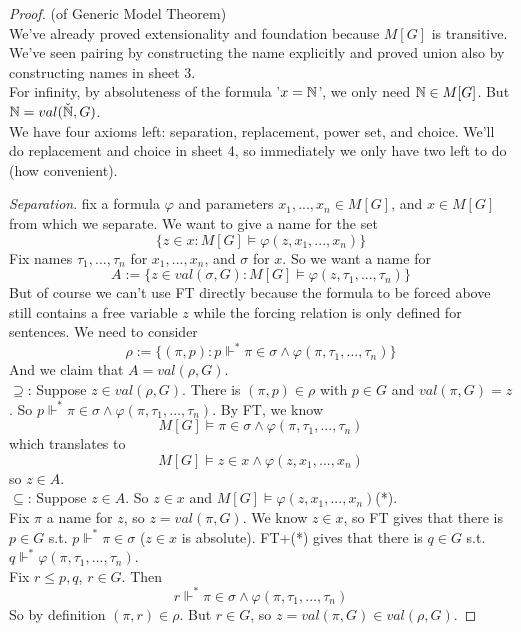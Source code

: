 \documentclass[a4paper]{article}
\begin{document}
\begin{proof} (of Generic Model Theorem)\\
We've already proved extensionality and foundation because $M[G]$ is transitive. We've seen pairing by constructing the name explicitly and proved union also by constructing names in sheet 3.\\
For infinity, by absoluteness of the formula '$x=\mathbb{N}$', we only need $\mathbb{N} \in M[G]$. But $\mathbb{N} = val(\check{\mathbb{N}},G)$.\\
We have four axioms left: separation, replacement, power set, and choice. We'll do replacement and choice in sheet 4, so immediately we only have two left to do (how convenient).

\emph{Separation}. fix a formula $\varphi$ and parameters $x_1,...,x_n \in M[G]$, and $x \in M[G]$ from which we separate. We want to give a name for the set 
\[
\{z \in x: M[G] \vDash \varphi(z,x_1,...,x_n)\}
\]
Fix names $\tau_1,...,\tau_n$ for $x_1,...,x_n$, and $\sigma$ for $x$. So we want a name for
\[
A:=\{z \in val(\sigma,G): M[G] \vDash \varphi(z,\tau_1,...,\tau_n)\}
\]
But of course we can't use FT directly because the formula to be forced above still contains a free variable $z$ while the forcing relation is only defined for sentences. We need to consider
\[
\rho:=\{(\pi,p):p \Vdash^* \pi \in \sigma \wedge \varphi(\pi,\tau_1,...,\tau_n)\}
\]
And we claim that $A = val(\rho,G)$.\\
$\supseteq$: Suppose $z \in val(\rho,G)$. There is $(\pi,p) \in \rho$ with $p \in G$ and $val(\pi,G) = z$. So $p \Vdash^* \pi \in \sigma \wedge \varphi(\pi,\tau_1,...,\tau_n)$. By FT, we know
\[
M[G] \vDash \pi\in\sigma \wedge \varphi(\pi,\tau_1,...,\tau_n)
\]
which translates to
\[
M[G] \vDash z\in x \wedge \varphi(z,x_1,...,x_n)
\]
so $z \in A$.\\
$\subseteq$: Suppose $z \in A$. So $z \in x$ and $M[G] \vDash \varphi(z,x_1,...,x_n)$(*).\\
Fix $\pi$ a name for $z$, so $z = val(\pi,G)$. We know $z \in x$, so FT gives that there is $p \in G$ s.t. $p \Vdash^* \pi \in \sigma$ ($z \in x$ is absolute). FT+(*) gives that there is $q \in G$ s.t. $q \Vdash^* \varphi(\pi,\tau_1,...,\tau_n)$.\\
Fix $r \leq p,q$, $r \in G$. Then
\[
r \Vdash^* \pi \in \sigma \wedge \varphi(\pi,\tau_1,...,\tau_n)
\]
So by definition $(\pi,r) \in \rho$. But $r \in G$, so $z=val(\pi,G) \in val(\rho,G)$.


\end{proof}
\end{document}
